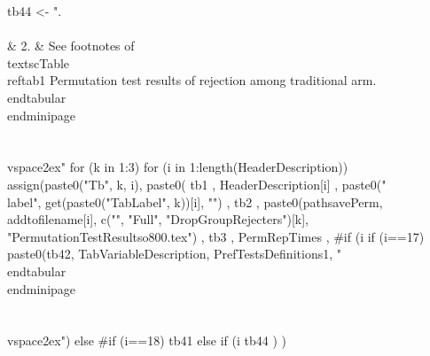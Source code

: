 \begin{Schunk}
\begin{Sinput}
tb44 <- ".\\\\& 2. &  See footnotes of \\textsc{Table \\ref{tab1 Permutation test results of rejection among traditional arm}}. \\end{tabular}\\end{minipage}\\\\\\vspace{2ex}"
for (k in 1:3) 
  for (i in 1:length(HeaderDescription))
    assign(paste0("Tb", k, i), 
      paste0(
        tb1
        , 
        HeaderDescription[i]
        ,
        paste0("\\label{", get(paste0("TabLabel", k))[i], "}")
        ,
        tb2
        , 
        paste0(pathsavePerm, addtofilename[i], c("", "Full", "DropGroupRejecters")[k],
          "PermutationTestResultso800.tex")
        , 
        tb3
        ,
        PermRepTimes
        ,
        #if (i %in% c(1, 5, 11, 17, 21, 25)) tb42 else tb41
        if (i==17) 
        paste0(tb42, TabVariableDescription, PrefTestsDefinitions1, "\\end{tabular}\\end{minipage}\\\\\\vspace{2ex}") else 
        #if (i==18) tb41 else 
        if (i %in% c(1, 5, 11, 18, 21, 25)) tb43 else 
        tb44
        )
      )
\end{Sinput}
\end{Schunk}

